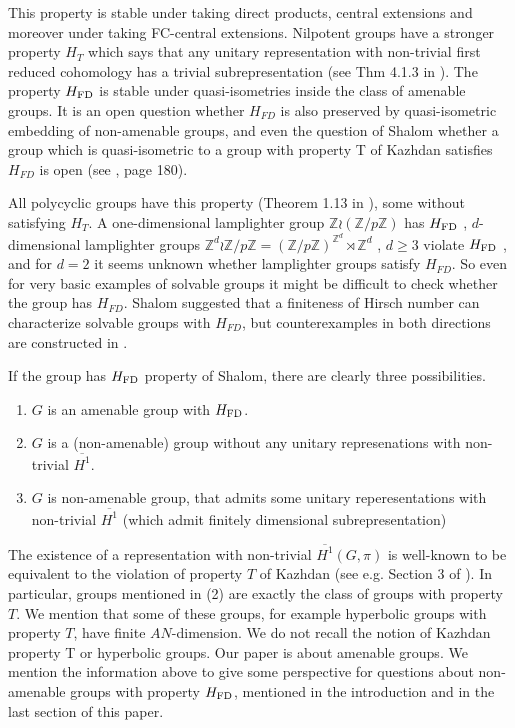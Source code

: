 \documentclass{amsart}
\numberwithin{figure}{section}
\theoremstyle{plain}
\theoremstyle{definition}
\begin{document}
This property  is stable under taking direct products, central extensions \cite{shalom} and moreover under taking FC-central extensions. Nilpotent groups have a stronger property $H_T$ which says that any unitary representation with non-trivial first reduced cohomology has a trivial subrepresentation
(see Thm 4.1.3 in \cite{shalom}). 
The property $H_{\rm FD}$ is stable under quasi-isometries inside the class of amenable groups. It is an open question whether $H_{FD}$ is also preserved by quasi-isometric embedding of
non-amenable groups, and even the question of Shalom whether a group which is 
quasi-isometric to a group with property T of Kazhdan satisfies $H_{FD}$ is open (see
\cite{shalom}, page 180).

All polycyclic groups have this property (Theorem 1.13 in \cite{shalom}), some without satisfying $H_T$.  
A one-dimensional lamplighter group $\mathbb{Z}\wr (\mathbb{Z}/p\mathbb{Z})$ has $H_{\rm FD}$ \cite{shalom}, $d$-dimensional lamplighter groups $\mathbb{Z}^d \wr \mathbb{Z} /p \mathbb{Z} =    \left( \mathbb{Z} /p \mathbb{Z} \right)^{\mathbb{Z}^d} \rtimes \mathbb{Z}^d$
, $d\ge 3$  violate $H_{\rm FD}$ \cite{brieusselzhengHFD}, and for $d=2$ it seems unknown whether lamplighter groups satisfy $H_{FD}$.
So even for very basic examples of solvable groups it might be difficult to check whether the group has $H_{FD}$. Shalom suggested that a finiteness of Hirsch number can characterize solvable groups with $H_{FD}$, but counterexamples in both directions are constructed in \cite{brieusselzhengHFD}.

If the group has $H_{\rm FD}$ property of 
Shalom, there are clearly three  possibilities. 
\begin{enumerate}
\item $G$ is an amenable group with $H_{\rm FD}$.
\item $G$ is a (non-amenable) group without any 
unitary represenations with non-trivial $\overline{H^1}$.
\item $G$ is non-amenable group, that admits some unitary reperesentations with non-trivial $\overline{H^1}$ (which admit finitely dimensional subrepresentation)
\end{enumerate}
The existence of a representation with non-trivial 
$\overline{H^1}(G, \pi)$ is well-known to be equivalent to the violation of property $T$ of Kazhdan (see e.g.
Section 3 of \cite{bekkadelaharpevalette}).
In particular, groups mentioned in (2) are exactly the class of groups with property $T$.
We mention that some of these groups, for example
hyperbolic groups with property $T$, have finite $AN$-dimension. We do not 
recall the notion of Kazhdan property T or hyperbolic groups.
Our paper is about amenable groups. We mention the information above
to give some perspective for questions about non-amenable groups with property $H_{\rm FD}$, mentioned in the introduction and in the last section of this paper.
\end{document}
